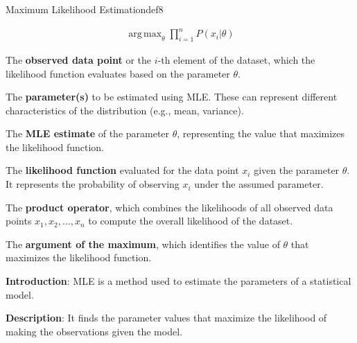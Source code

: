 \documentclass[
  12 pt,
  a4paper,
]{book}
\numberwithin{equation}{section}
\theoremstyle{plain}      %
\theoremstyle{definition} %
\theoremstyle{remark}     %
\theoremstyle{note}         %
\begin{document}
\begin{a_def_eq}{Maximum Likelihood Estimation}{def8} 

\begin{align}
\mathop{\mathrm{arg\,max}}_{\theta} \prod_{i=1}^n P(x_i | \theta)
\end{align}


\begin{description}[align=left, labelwidth=2cm, labelsep=0em, leftmargin=2cm]
    \item[$x_i$] The \textbf{observed data point} or the \( i \)-th element of the dataset, which the likelihood function evaluates based on the parameter \( \theta \).
    \vspace{0.5\baselineskip}
    \item[$\theta$] The \textbf{parameter(s)} to be estimated using MLE. These can represent different characteristics of the distribution (e.g., mean, variance).
    \vspace{0.5\baselineskip}
    \item[$\hat{\theta}$] The \textbf{MLE estimate} of the parameter \( \theta \), representing the value that maximizes the likelihood function.
    \vspace{0.5\baselineskip}
    \item[$P(x_i | \theta)$] The \textbf{likelihood function} evaluated for the data point \( x_i \) given the parameter \( \theta \). It represents the probability of observing \( x_i \) under the assumed parameter.
    \vspace{0.5\baselineskip}
    \item[$\prod$] The \textbf{product operator}, which combines the likelihoods of all observed data points \( x_1, x_2, \dots, x_n \) to compute the overall likelihood of the dataset.
    \vspace{0.5\baselineskip}
    \item[$\arg\max$] The \textbf{argument of the maximum}, which identifies the value of \( \theta \) that maximizes the likelihood function.
    \vspace{0.5\baselineskip}
\end{description}

\end{a_def_eq}

\hfill\break

\textbf{Introduction}: MLE is a method used to estimate the parameters
of a statistical model.

\textbf{Description}: It finds the parameter values that maximize the
likelihood of making the observations given the model.
\end{document}

